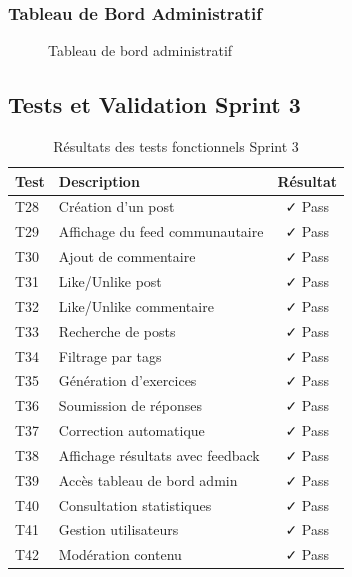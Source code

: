 \subsubsection{Tableau de Bord Administratif}

\begin{figure}[H]
    \centering
    \caption{Tableau de bord administratif}
    \label{fig:ui-admin-dashboard}
\end{figure}

\subsection{Tests et Validation Sprint 3}

\begin{table}[H]
\centering
\caption{Résultats des tests fonctionnels Sprint 3}
\label{tab:tests-sprint3}
\begin{tabular}{|l|p{6cm}|c|}
\hline
\textbf{Test} & \textbf{Description} & \textbf{Résultat} \\
\hline
T28 & Création d'un post & ✓ Pass \\
\hline
T29 & Affichage du feed communautaire & ✓ Pass \\
\hline
T30 & Ajout de commentaire & ✓ Pass \\
\hline
T31 & Like/Unlike post & ✓ Pass \\
\hline
T32 & Like/Unlike commentaire & ✓ Pass \\
\hline
T33 & Recherche de posts & ✓ Pass \\
\hline
T34 & Filtrage par tags & ✓ Pass \\
\hline
T35 & Génération d'exercices & ✓ Pass \\
\hline
T36 & Soumission de réponses & ✓ Pass \\
\hline
T37 & Correction automatique & ✓ Pass \\
\hline
T38 & Affichage résultats avec feedback & ✓ Pass \\
\hline
T39 & Accès tableau de bord admin & ✓ Pass \\
\hline
T40 & Consultation statistiques & ✓ Pass \\
\hline
T41 & Gestion utilisateurs & ✓ Pass \\
\hline
T42 & Modération contenu & ✓ Pass \\
\hline
\end{tabular}
\end{table}

